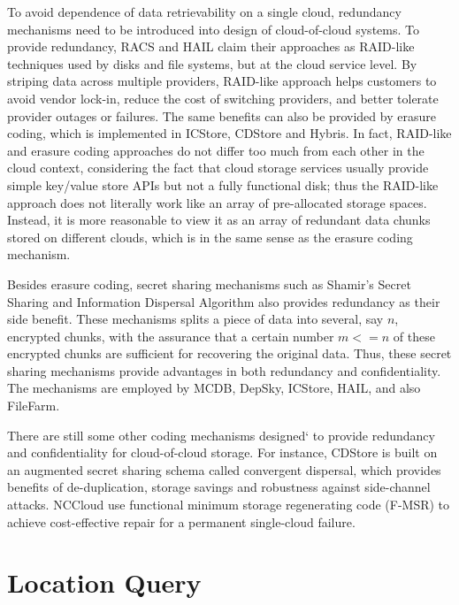 To avoid dependence of data retrievability on a single cloud, redundancy mechanisms need to be introduced into design of cloud-of-cloud systems. To provide redundancy, RACS\cite{abu2010racs} and HAIL\cite{bowers2009hail} claim their approaches as RAID-like techniques used by disks and file systems, but at the cloud service level. By striping data across multiple providers, RAID-like approach helps customers to avoid vendor lock-in, reduce the cost of switching providers, and better tolerate provider outages or failures. The same benefits can also be provided by erasure coding, which is implemented in ICStore\cite{cachin2010dependable}, CDStore\cite{li2015cdstore} and Hybris\cite{dobre2014hybris}. In fact, RAID-like and erasure coding approaches do not differ too much from each other in the cloud context, considering the fact that cloud storage services usually provide simple key/value store APIs but not a fully functional disk; thus the RAID-like approach does not literally work like an array of pre-allocated storage spaces. Instead, it is more reasonable to view it as an array of redundant data chunks stored on different clouds, which is in the same sense as the erasure coding mechanism.

Besides erasure coding, secret sharing mechanisms such as Shamir's Secret Sharing\cite{shamir1979share} and Information Dispersal Algorithm\cite{rabin1989efficient} also provides redundancy as their side benefit. These mechanisms splits a piece of data into several, say $n$, encrypted chunks, with the assurance that a certain number $m <= n$ of these encrypted chunks are sufficient for recovering the original data. Thus, these secret sharing mechanisms provide advantages in both redundancy and confidentiality. The mechanisms are employed by MCDB\cite{alzain2011mcdb}, DepSky\cite{bessani2013depsky}, ICStore\cite{cachin2010dependable}, HAIL\cite{bowers2009hail}, and also FileFarm.

There are still some other coding mechanisms designed` to provide redundancy and confidentiality for cloud-of-cloud storage. For instance, CDStore\cite{li2015cdstore} is built on an augmented secret sharing schema called convergent dispersal, which provides benefits of de-duplication, storage savings and robustness against side-channel attacks. NCCloud\cite{hu2012nccloud} use functional minimum storage regenerating code (F-MSR) to achieve cost-effective repair for a permanent single-cloud failure.

\section{Location Query}
\label{ss:coclocationquery}

